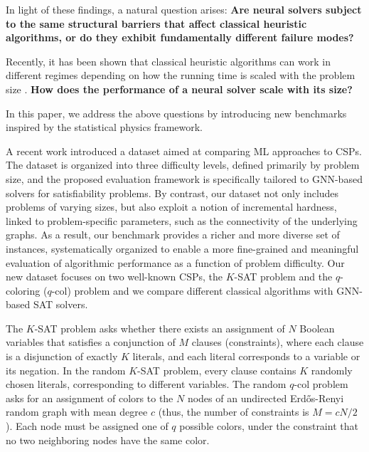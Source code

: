 \documentclass{article}
\begin{document}
In light of these findings, a natural question arises: \textbf{Are neural solvers subject to the same structural barriers that affect classical heuristic algorithms, or do they exhibit fundamentally different failure modes?}

Recently, it has been shown that classical heuristic algorithms can work in different regimes depending on how the running time is scaled with the problem size \cite{angelini2025algorithmic}. \textbf{How does the performance of a neural solver scale with its size?}

In this paper, we address the above questions by introducing new benchmarks inspired by the statistical physics framework.

A recent work \cite{li_g4satbench_2023} introduced a dataset aimed at comparing ML approaches to CSPs. The dataset is organized into three difficulty levels, defined primarily by problem size, and the proposed evaluation framework is specifically tailored to GNN-based solvers for satisfiability problems. By contrast, our dataset not only includes problems of varying sizes, but also exploit a notion of incremental hardness, linked to problem-specific parameters, such as the connectivity of the underlying graphs. As a result, our benchmark provides a richer and more diverse set of instances, systematically organized to enable a more fine-grained and meaningful evaluation of algorithmic performance as a function of problem difficulty. Our new dataset focuses on two well-known CSPs, the $K$-SAT problem and the $q$-coloring ($q$-col) problem and we compare different classical algorithms with GNN-based SAT solvers. 

The $K$-SAT problem asks whether there exists an assignment of $N$ Boolean variables that satisfies a conjunction of $M$ clauses (constraints), where each clause is a disjunction of exactly $K$ literals, and each literal corresponds to a variable or its negation. In the random $K$-SAT problem, every clause contains $K$ randomly chosen literals, corresponding to different variables. The random $q$-col problem asks for an assignment of colors to the $N$ nodes of an undirected Erd\H{o}s-Renyi random graph with mean degree $c$ (thus, the number of constraints is $M=cN/2$). Each node must be assigned one of $q$ possible colors, under the constraint that no two neighboring nodes have the same color.
\end{document}

